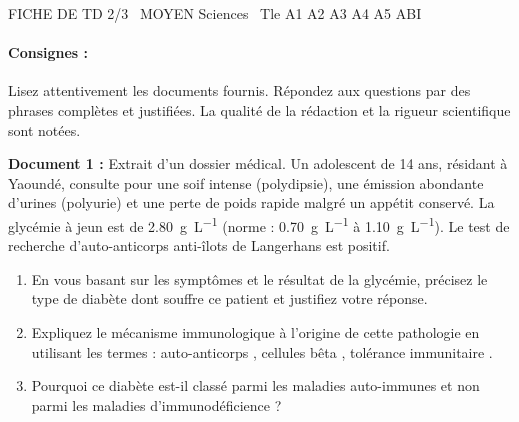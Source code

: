 \documentclass[11pt]{article}
\begin{document}
\begin{tcolorbox}[enhanced,colback=popink,colframe=popink,arc=10pt,boxrule=0pt,left=12pt,right=12pt,top=9pt,bottom=9pt]
{\color{white}\popxbold\small FICHE DE TD 2/3 \textbullet\ MOYEN \hfill Sciences \textbullet\ Tle A1 A2 A3 A4 A5 ABI\par}
\end{tcolorbox}
\vspace{4pt}
\paragraph{Consignes :} Lisez attentivement les documents fournis. Répondez aux questions par des phrases complètes et justifiées. La qualité de la rédaction et la rigueur scientifique sont notées.

\begin{exercice}
\textbf{Document 1 :} Extrait d'un dossier médical. Un adolescent de 14 ans, résidant à Yaoundé, consulte pour une soif intense (polydipsie), une émission abondante d'urines (polyurie) et une perte de poids rapide malgré un appétit conservé. La glycémie à jeun est de \SI{2,80}{\gram\per\liter} (norme : \SI{0,70}{\gram\per\liter} à \SI{1,10}{\gram\per\liter}). Le test de recherche d'auto-anticorps anti-îlots de Langerhans est positif.
\begin{enumerate}
    \item En vous basant sur les symptômes et le résultat de la glycémie, précisez le type de diabète dont souffre ce patient et justifiez votre réponse.
    \item Expliquez le mécanisme immunologique à l'origine de cette pathologie en utilisant les termes : \og auto-anticorps \fg, \og cellules bêta \fg, \og tolérance immunitaire \fg.
    \item Pourquoi ce diabète est-il classé parmi les maladies auto-immunes et non parmi les maladies d'immunodéficience ?
\end{enumerate}
\end{exercice}
\end{document}
